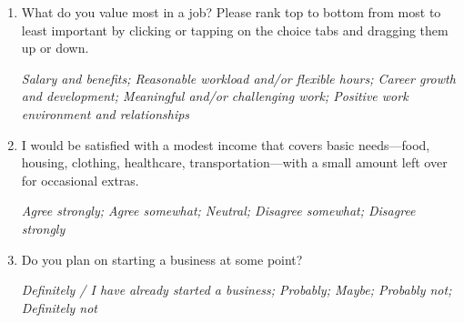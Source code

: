 \documentclass[11pt, headsepline]{article}
\begin{document}
\begin{enumerate}[resume]

    \item What do you value most in a job? Please rank top to bottom from most to least important by clicking or tapping on the choice tabs and dragging them up or down.

    \textit{Salary and benefits; Reasonable workload and/or flexible hours; Career growth and development; Meaningful and/or challenging work; Positive work environment and relationships}



    \item I would be satisfied with a modest income that covers basic needs—food, housing, clothing, healthcare, transportation—with a small amount left over for occasional extras.

    \textit{Agree strongly; Agree somewhat; Neutral; Disagree somewhat; Disagree strongly}

    \item Do you plan on starting a business at some point?

    \textit{Definitely / I have already started a business; Probably; Maybe; Probably not; Definitely not}

    






\end{enumerate}
\end{document}

